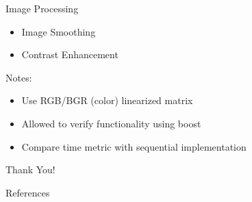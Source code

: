 \documentclass{beamer}
\begin{document}
\begin{frame}{Image Processing}
  \begin{itemize}
    \item Image Smoothing
    \item Contrast Enhancement
  \end{itemize}
  Notes:
  \begin{itemize}
    \item Use RGB/BGR (color) linearized matrix
    \item Allowed to verify functionality using boost
    \item Compare time metric with sequential implementation
  \end{itemize}
\end{frame}

\begin{frame}
    \centering
    \Huge{Thank You!}
\end{frame}

\begin{frame}{References}
\end{frame}
\end{document}
